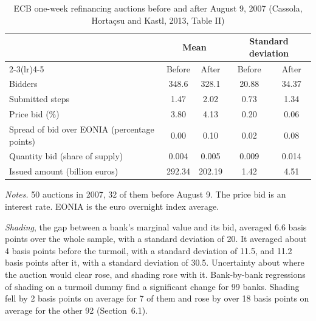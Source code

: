\begin{table}[htbp]
\centering
\caption{ECB one-week refinancing auctions before and after August 9, 2007 (Cassola, Horta\c{c}su and Kastl,
2013, Table II)}
\label{tab:15-chk-data}
\small
\begin{tabular}{lcccc}
\toprule
 & \multicolumn{2}{c}{Mean} & \multicolumn{2}{c}{Standard deviation}\\
\cmidrule(lr){2-3}\cmidrule(lr){4-5}
 & Before & After & Before & After\\
\midrule
Bidders & 348.6 & 328.1 & 20.88 & 34.37\\
Submitted steps & 1.47 & 2.02 & 0.73 & 1.34\\
Price bid (\%) & 3.80 & 4.13 & 0.20 & 0.06\\
Spread of bid over EONIA (percentage points) & 0.00 & 0.10 & 0.02 & 0.08\\
Quantity bid (share of supply) & 0.004 & 0.005 & 0.009 & 0.014\\
Issued amount (billion euros) & 292.34 & 202.19 & 1.42 & 4.51\\
\bottomrule
\end{tabular}

\smallskip
\begin{minipage}{0.93\textwidth}
\footnotesize \textit{Notes.} 50 auctions in 2007, 32 of them before August 9. The price bid is an interest
rate. EONIA is the euro overnight index average.
\end{minipage}
\end{table}

 \emph{Shading}, the gap between a bank's marginal value and its bid, averaged 6.6 basis
points over the whole sample, with a standard deviation of 20. It averaged about 4 basis points before the
turmoil, with a standard deviation of 11.5, and 11.2 basis points after it, with a standard deviation of 30.5.
Uncertainty about where the auction would clear rose, and shading rose with it. Bank-by-bank regressions of
shading on a turmoil dummy find a significant change for 99 banks. Shading fell by 2 basis points on average
for 7 of them and rose by over 18 basis points on average for the other 92 (Section~6.1).

